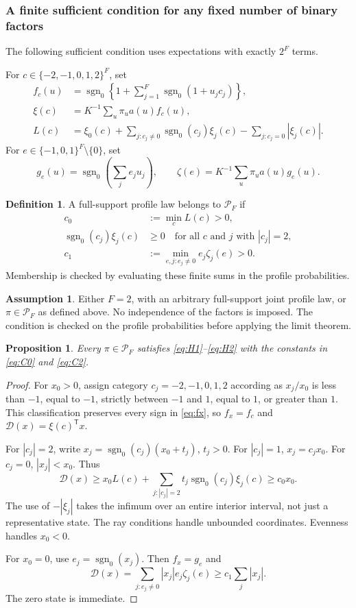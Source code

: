 \documentclass[12pt,a4paper]{article}
\newtheorem{proposition}{Proposition}
\theoremstyle{definition}
\newtheorem{assumption}{Assumption}
\newtheorem{definition}{Definition}
\theoremstyle{remark}\newtheorem{remark}{Remark}
\numberwithin{equation}{section}
\newcommand{\sg}{\operatorname{sgn}_0}
\newcommand{\trans}{^{\mathsf T}}
\begin{document}
\subsubsection{A finite sufficient condition for any fixed number of binary factors}\label{sec:finite-condition}
The following sufficient condition uses expectations with exactly $2^F$ terms.

For $c\in\{-2,-1,0,1,2\}^F$, set
\begin{align}
 f_c(u)&=\sg\left\{1+\sum_{j=1}^F\sg(1+u_jc_j)\right\},\\
 \xi(c)&=K^{-1}\sum_u\pi_u a(u)f_c(u),\\
 L(c)&=\xi_0(c)+\sum_{j:c_j\ne0}\sg(c_j)\xi_j(c)
                  -\sum_{j:c_j=0}|\xi_j(c)|. \label{eq:finite-condition-base}
\end{align}
For $e\in\{-1,0,1\}^F\setminus\{0\}$, set
\[
 g_e(u)=\sg\left(\sum_je_ju_j\right),\qquad
 \zeta(e)=K^{-1}\sum_u\pi_u a(u)g_e(u).
\]
\begin{definition}\label{def:finite-condition}
A full-support profile law belongs to $\mathcal P_F$ if
\begin{align}
 c_0&:=\min_c L(c)>0,\label{eq:C0}\\
 \sg(c_j)\xi_j(c)&\ge0\quad\text{for all }c\text{ and }j\text{ with }|c_j|=2,\label{eq:C1}\\
 c_1&:=\min_{e,j:e_j\ne0} e_j\zeta_j(e)>0.\label{eq:C2}
\end{align}
Membership is checked by evaluating these finite sums in the profile probabilities.
\end{definition}
\begin{assumption}\label{ass:supp-profile}
Either $F=2$, with an arbitrary full-support joint profile law, or $\pi\in\mathcal P_F$ as defined above. No independence of the factors is imposed. The condition is checked on the profile probabilities before applying the limit theorem.
\end{assumption}


\begin{proposition}\label{prop:finite-condition}
Every $\pi\in\mathcal P_F$ satisfies \eqref{eq:H1}--\eqref{eq:H2} with the constants in \eqref{eq:C0} and \eqref{eq:C2}.
\end{proposition}
\begin{proof}
For $x_0>0$, assign category $c_j=-2,-1,0,1,2$ according as $x_j/x_0$ is less than $-1$, equal to $-1$, strictly between $-1$ and $1$, equal to $1$, or greater than $1$. This classification preserves every sign in \eqref{eq:fx}, so $f_x=f_c$ and $\mathcal D(x)=\xi(c)\trans x$.

For $|c_j|=2$, write $x_j=\sg(c_j)(x_0+t_j)$, $t_j>0$. For $|c_j|=1$, $x_j=c_jx_0$. For $c_j=0$, $|x_j|<x_0$. Thus
\[
 \mathcal D(x)\ge x_0L(c)+\sum_{j:|c_j|=2}t_j\sg(c_j)\xi_j(c)\ge c_0x_0.
\]
The use of $-|\xi_j|$ takes the infimum over an entire interior interval, not just a representative state. The ray conditions handle unbounded coordinates. Evenness handles $x_0<0$.

For $x_0=0$, use $e_j=\sg(x_j)$. Then $f_x=g_e$ and
\[
 \mathcal D(x)=\sum_{j:e_j\ne0}|x_j|e_j\zeta_j(e)\ge c_1\sum_j|x_j|.
\]
The zero state is immediate.
\end{proof}
\end{document}
